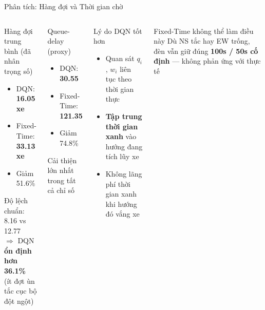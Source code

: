 \begin{frame}{Phân tích: Hàng đợi và Thời gian chờ}
  \begin{columns}[T]
    \begin{block}{Hàng đợi trung bình (đã nhân trọng số)}
      \begin{itemize}
        \item DQN: \textbf{16.05 xe}
        \item Fixed-Time: \textbf{33.13 xe}
        \item[$\Rightarrow$] \alert{Giảm 51.6\%}
      \end{itemize}
      Độ lệch chuẩn: 8.16 vs 12.77\\
      $\Rightarrow$ DQN \textbf{ổn định hơn 36.1\%}\\
      (ít đợt ùn tắc cục bộ đột ngột)
    \end{block}
    \vspace{6pt}
    \begin{block}{Queue-delay (proxy)}
      \begin{itemize}
        \item DQN: \textbf{30.55}
        \item Fixed-Time: \textbf{121.35}
        \item[$\Rightarrow$] \alert{Giảm 74.8\%}
      \end{itemize}
      Cải thiện lớn nhất trong tất cả chỉ số
    \end{block}

    \begin{exampleblock}{Lý do DQN tốt hơn}
      \begin{itemize}
        \item Quan sát $q_i$, $w_i$ liên tục theo thời gian thực
        \item \textbf{Tập trung thời gian xanh} vào hướng đang tích lũy xe
        \item Không lãng phí thời gian xanh khi hướng đó vắng xe
      \end{itemize}
    \end{exampleblock}
    \vspace{6pt}
    \begin{alertblock}{Fixed-Time không thể làm điều này}
      Dù NS tắc hay EW trống, đèn vẫn giữ đúng \textbf{100s / 50s cố định} --- không phản ứng với thực tế
    \end{alertblock}
  \end{columns}
\end{frame}

